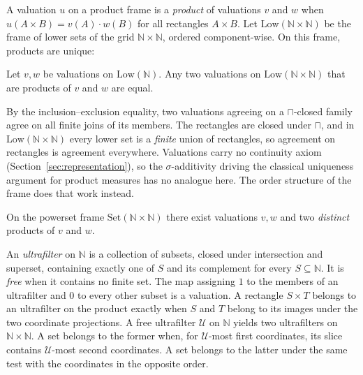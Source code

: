 A valuation $u$ on a product frame is a \emph{product} of
valuations $v$ and $w$ when $u(A \times B) = v(A) \cdot w(B)$ for
all rectangles $A \times B$.  Let
$\mathrm{Low}(\mathbb{N} \times \mathbb{N})$ be the frame of lower
sets of the grid $\mathbb{N} \times \mathbb{N}$, ordered
component-wise.  On this frame, products are unique:

\begin{theorem}
\label{thm:product-unique}
Let $v, w$ be valuations on $\mathrm{Low}(\mathbb{N})$.  Any two
valuations on $\mathrm{Low}(\mathbb{N} \times \mathbb{N})$ that are
products of $v$ and $w$ are equal.
\end{theorem}

\noindent
By the inclusion--exclusion equality, two valuations agreeing on a
$\sqcap$-closed family agree on all finite joins of its
members.  The rectangles are
closed under $\sqcap$, and in
$\mathrm{Low}(\mathbb{N} \times \mathbb{N})$ every lower set is a
\emph{finite} union of
rectangles, so agreement on
rectangles is agreement everywhere.  Valuations carry no continuity
axiom (Section~\ref{sec:representation}), 
so the $\sigma$-additivity driving the
classical uniqueness argument for product measures has no analogue
here.  The order structure of the frame does that work instead.

\begin{theorem}
\label{thm:product-not-unique}
On the powerset frame $\mathrm{Set}(\mathbb{N} \times \mathbb{N})$
there exist valuations $v, w$ and two \emph{distinct} products of
$v$ and $w$.
\end{theorem}

\noindent
An \emph{ultrafilter} on $\mathbb{N}$ is a collection of subsets,
closed under intersection and superset, containing exactly one of
$S$ and its complement for every $S \subseteq \mathbb{N}$.  It is
\emph{free} when it contains no finite set.  The map assigning $1$
to the members of an ultrafilter and $0$ to every other subset is a
valuation.  A rectangle $S \times T$
belongs to an ultrafilter on the product exactly when $S$ and $T$
belong to its images under the two coordinate
projections.  A free ultrafilter
$\mathcal{U}$ on $\mathbb{N}$ yields two ultrafilters on
$\mathbb{N} \times \mathbb{N}$.  A set belongs to the former when,
for $\mathcal{U}$-most first coordinates, its slice contains
$\mathcal{U}$-most second coordinates.  A set belongs to the latter
under the same test with the coordinates in the opposite order.

